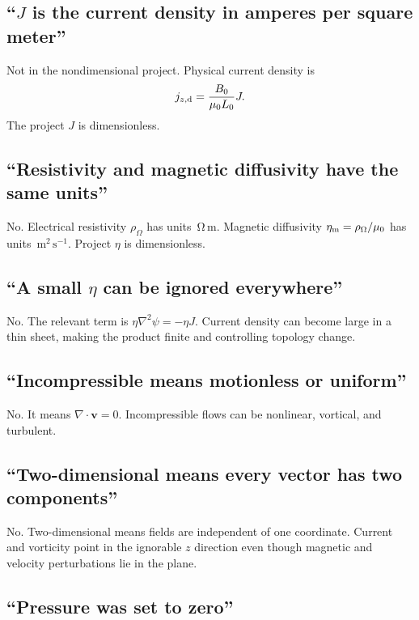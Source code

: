 \documentclass[11pt]{article}
\newcommand{\vect}[1]{\bm{#1}}
\newcommand{\unit}[1]{\,\mathrm{#1}}
\begin{document}
\subsection{``$J$ is the current density in amperes per square meter''}

Not in the nondimensional project. Physical current density is
\begin{equation}
j_{z,\rm d}=\frac{B_0}{\mu_0L_0}J.
\end{equation}
The project $J$ is dimensionless.

\subsection{``Resistivity and magnetic diffusivity have the same units''}

No. Electrical resistivity $\rho_\Omega$ has units $\unit{\Omega\,m}$. Magnetic diffusivity $\eta_{\rm m}=\rho_\Omega/\mu_0$ has units $\unit{m^2\,s^{-1}}$. Project $\eta$ is dimensionless.

\subsection{``A small $\eta$ can be ignored everywhere''}

No. The relevant term is $\eta\nabla^2\psi=-\eta J$. Current density can become large in a thin sheet, making the product finite and controlling topology change.

\subsection{``Incompressible means motionless or uniform''}

No. It means $\nabla\cdot\vect{v}=0$. Incompressible flows can be nonlinear, vortical, and turbulent.

\subsection{``Two-dimensional means every vector has two components''}

No. Two-dimensional means fields are independent of one coordinate. Current and vorticity point in the ignorable $z$ direction even though magnetic and velocity perturbations lie in the plane.

\subsection{``Pressure was set to zero''}
\end{document}

